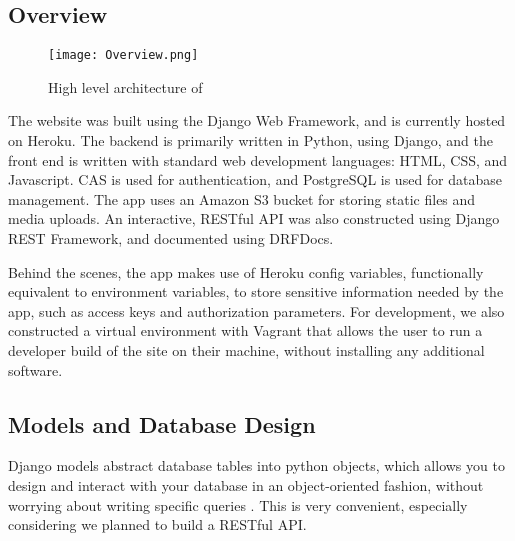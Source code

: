 
\subsection{Overview}

\begin{figure}[!htbp]
    \centering
    \texttt{[image: Overview.png]}
    \caption{High level architecture of \tigeruhr{}}
    \label{fig:architecture}
\end{figure}

The website was built using the Django Web Framework, and is currently hosted on Heroku. The backend is primarily written in Python, using Django, and the front end is written with standard web development languages: HTML, CSS, and Javascript. CAS is used for authentication, and PostgreSQL is used for database management. The app uses an Amazon S3 bucket for storing static files and media uploads. An interactive, RESTful API was also constructed using Django REST Framework, and documented using DRFDocs.

Behind the scenes, the app makes use of Heroku config variables, functionally equivalent to environment variables, to store sensitive information needed by the app, such as access keys and authorization parameters. For development, we also constructed a virtual environment with Vagrant that allows the user to run a developer build of the site on their machine, without installing any additional software.

\subsection{Models and Database Design}


Django models abstract database tables into python objects, which allows you to design and interact with your database in an object-oriented fashion, without worrying about writing specific queries \cite{django-models}. This is very convenient, especially considering we planned to build a RESTful API.

